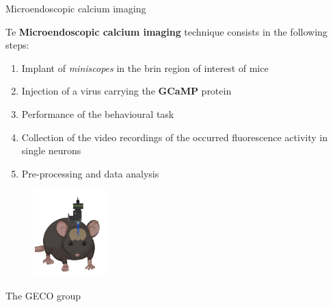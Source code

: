 \documentclass{beamer}
\begin{document}
\begin{frame}{Microendoscopic calcium imaging}



Te \textbf{Microendoscopic calcium imaging} technique consists in the following steps:

\begin{enumerate}
	
	\item Implant of \textit{miniscopes} in the brin region of interest of mice
	
	\item Injection of a virus carrying the \textbf{GCaMP} protein
	
	\item Performance of the behavioural task
	
	\item Collection of the video recordings of the occurred fluorescence activity in single neurons
	
	\item Pre-processing and data analysis
\end{enumerate}

\begin{figure}[H]
	
	\centering
	\includegraphics[width=0.25\textwidth]{inscopix}
	
\end{figure}
\end{frame}

\begin{frame}{The GECO group}


\end{frame}
\end{document}
